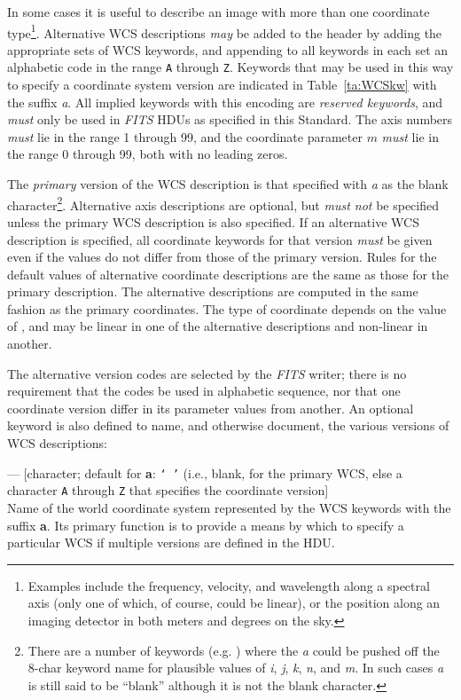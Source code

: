 \documentclass[11pt,makeidx]{book}     %
\begin{document}
In some cases it is useful to describe an image with more than one coordinate 
type\footnote[1]{Examples include the frequency, velocity, and wavelength along a
spectral axis (only one of which, of course, could be linear), or the position
along an imaging detector in both meters and degrees on the sky.}.  Alternative WCS
descriptions {\em may} be added to the header by adding the appropriate sets of
WCS keywords, and appending to all keywords in each set an alphabetic code in the
range {\tt A} through {\tt Z}. Keywords that may be used in this way to specify a
coordinate system version are indicated in Table~\ref{ta:WCSkw} with the suffix \textit{a}.
All implied keywords with this encoding are {\em reserved keywords}, and
{\em must} only be used in {\em FITS\/} HDUs as specified in this Standard. The axis
numbers {\em must} lie in the range 1 through 99, and the coordinate parameter $m$
{\em must} lie in the range 0 through 99, both with no leading zeros. 

The {\em primary} version of the WCS description is that specified with {\it a}
as the blank character\footnote[2]{There are a number of keywords  (e.g. )
where the {\it a} could be pushed off the 8-char keyword name for plausible
values of {\it i}, {\it j}, {\it k}, {\it n}, and {\it m}.  
In such cases {\it a} is still said to be ``blank''
although it is not the blank character.}.
Alternative axis descriptions are optional, but {\em must
not} be specified unless the primary WCS description is also specified. If an
alternative WCS description is specified, all coordinate keywords for that version
{\em must} be given even if the values do not differ from those of the primary
version. Rules for the default values of alternative coordinate descriptions are the
same as those for the primary description. The alternative descriptions are computed
in the same fashion as the primary coordinates. The type of coordinate depends on
the value of , and may be linear in one of the alternative
descriptions and non-linear in another. 

The alternative version codes are selected by the {\em FITS\/} writer; there is no
requirement that the codes be used in alphabetic sequence, nor that one coordinate
version differ in its parameter values from another. An optional keyword
 is also defined to name, and otherwise document, the various
versions of WCS descriptions: 

\begin{description}

\item {}  --- [character; default for {\bf a}: \texttt{`\ '} (i.e.,
blank, for the primary WCS, else a character {\tt A} through {\tt Z} that
specifies the coordinate version]\\ 
Name of the world coordinate system represented by
the WCS keywords with the suffix {\bf a}. Its primary function is to provide a
means by which to specify a particular WCS if multiple versions are defined in the
HDU. 

\end{description}
\end{document}
